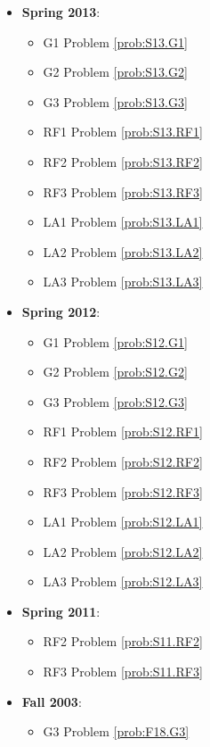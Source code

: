 \documentclass{article}
\theoremstyle{definition}
\begin{document}
\begin{itemize}
	\item \textbf{Spring 2013}:  
	\begin{itemize}
	\item G1 Problem \ref{prob:S13.G1} 
	\item G2 Problem \ref{prob:S13.G2} 
	\item G3 Problem \ref{prob:S13.G3}
	\item RF1 Problem \ref{prob:S13.RF1}
	\item RF2 Problem \ref{prob:S13.RF2}
	\item RF3 Problem \ref{prob:S13.RF3}
	\item LA1 Problem \ref{prob:S13.LA1}
	\item LA2 Problem \ref{prob:S13.LA2}
	\item LA3 Problem \ref{prob:S13.LA3}
	\end{itemize}
	\item \textbf{Spring 2012}:  
	\begin{itemize}
	\item G1 Problem \ref{prob:S12.G1} 
	\item G2 Problem \ref{prob:S12.G2} 
	\item G3 Problem \ref{prob:S12.G3}
	\item RF1 Problem \ref{prob:S12.RF1}
	\item RF2 Problem \ref{prob:S12.RF2}
	\item RF3 Problem \ref{prob:S12.RF3}
	\item LA1 Problem \ref{prob:S12.LA1}
	\item LA2 Problem \ref{prob:S12.LA2}
	\item LA3 Problem \ref{prob:S12.LA3}
	\end{itemize}
	\item \textbf{Spring 2011}:
	\begin{itemize}
		\item RF2 Problem \ref{prob:S11.RF2}
		\item RF3 Problem \ref{prob:S11.RF3}
	\end{itemize}
	\item \textbf{Fall 2003}:
	\begin{itemize}
		\item G3 Problem \ref{prob:F18.G3}
	\end{itemize}
\end{itemize}






\end{document}
